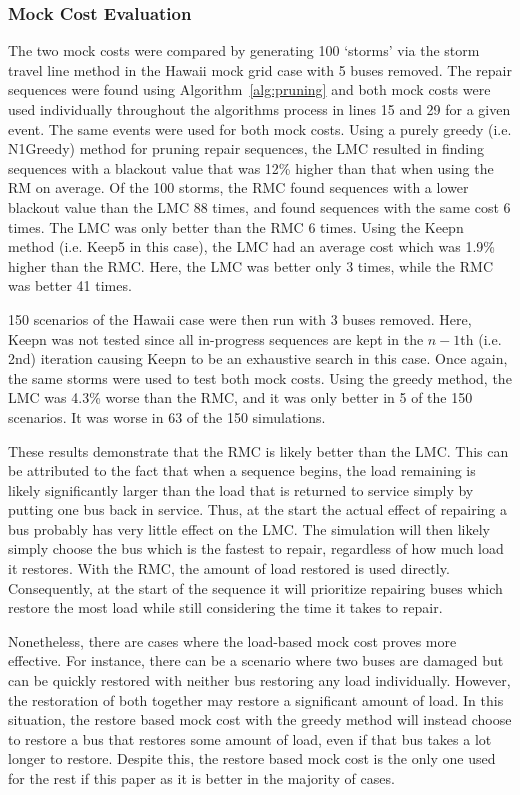 \documentclass[12pt]{article}
\begin{document}
\subsubsection{Mock Cost Evaluation} \label{MCostEval}
The two mock costs were compared by generating 100 `storms' via the storm travel line method in the Hawaii mock grid case with 5 buses removed. The repair sequences were found using Algorithm~\ref{alg:pruning} and both mock costs were used individually throughout the algorithms process in lines 15 and 29 for a given event. The same events were used for both mock costs. Using a purely greedy (i.e. N1Greedy) method for pruning repair sequences, the LMC resulted in finding sequences with a blackout value that was 12\% higher than that when using the RM on average. Of the 100 storms, the RMC found sequences with a lower blackout value than the LMC 88 times, and found sequences with the same cost 6 times. The LMC was only better than the RMC 6 times. Using the Keepn method (i.e. Keep5 in this case), the LMC had an average cost which was 1.9\% higher than the RMC. Here, the LMC was better only 3 times, while the RMC was better 41 times. \par
150 scenarios of the Hawaii case were then run with 3 buses removed. Here, Keepn was not tested since all in-progress sequences are kept in the $n-1$th (i.e. 2nd) iteration causing Keepn to be an exhaustive search in this case. Once again, the same storms were used to test both mock costs. Using the greedy method, the LMC was 4.3\% worse than the RMC, and it was only better in 5 of the 150 scenarios. It was worse in 63 of the 150 simulations. \par
These results demonstrate that the RMC is likely better than the LMC. This can be attributed to the fact that when a sequence begins, the load remaining is likely significantly larger than the load that is returned to service simply by putting one bus back in service. Thus, at the start the actual effect of repairing a bus probably has very little effect on the LMC. The simulation will then likely simply choose the bus which is the fastest to repair, regardless of how much load it restores. With the RMC, the amount of load restored is used directly. Consequently, at the start of the sequence it will prioritize repairing buses which restore the most load while still considering the time it takes to repair. \par
Nonetheless, there are cases where the load-based mock cost proves more effective. For instance, there can be a scenario where two buses are damaged but can be quickly restored with neither bus restoring any load individually. However, the restoration of both together may restore a significant amount of load. In this situation, the restore based mock cost with the greedy method will instead choose to restore a bus that restores some amount of load, even if that bus takes a lot longer to restore. Despite this, the restore based mock cost is the only one used for the rest if this paper as it is better in the majority of cases.
\end{document}
